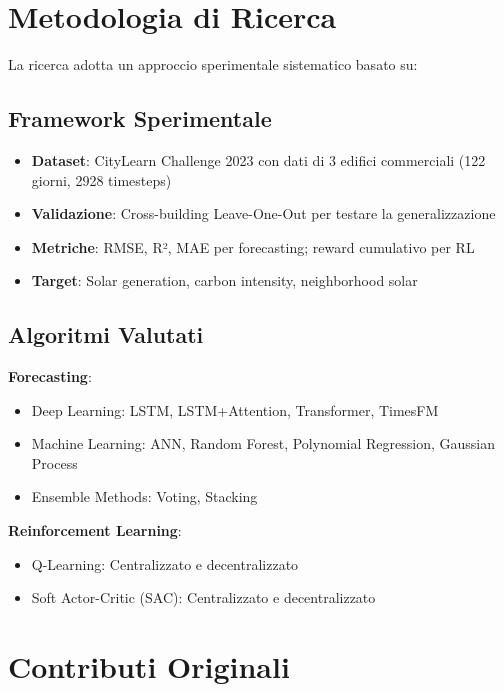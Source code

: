 \documentclass[12pt,a4paper,twoside]{report}
\begin{document}
\section{Metodologia di Ricerca}

La ricerca adotta un approccio sperimentale sistematico basato su:

\subsection{Framework Sperimentale}

\begin{itemize}
    \item \textbf{Dataset}: CityLearn Challenge 2023 con dati di 3 edifici commerciali (122 giorni, 2928 timesteps)
    \item \textbf{Validazione}: Cross-building Leave-One-Out per testare la generalizzazione
    \item \textbf{Metriche}: RMSE, R², MAE per forecasting; reward cumulativo per RL
    \item \textbf{Target}: Solar generation, carbon intensity, neighborhood solar
\end{itemize}

\subsection{Algoritmi Valutati}

\textbf{Forecasting}:
\begin{itemize}
    \item Deep Learning: LSTM, LSTM+Attention, Transformer, TimesFM
    \item Machine Learning: ANN, Random Forest, Polynomial Regression, Gaussian Process
    \item Ensemble Methods: Voting, Stacking
\end{itemize}

\textbf{Reinforcement Learning}:
\begin{itemize}
    \item Q-Learning: Centralizzato e decentralizzato
    \item Soft Actor-Critic (SAC): Centralizzato e decentralizzato
\end{itemize}

\section{Contributi Originali}
\end{document}
